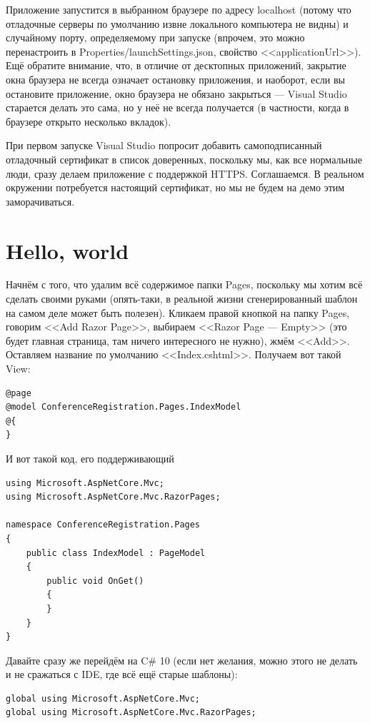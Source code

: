 \documentclass[a5paper]{article}
\begin{document}
Приложение запустится в выбранном браузере по адресу localhost (потому что отладочные серверы по умолчанию извне локального компьютера не видны) и случайному порту, определяемому при запуске (впрочем, это можно перенастроить в Properties/launchSettings.json, свойство <<applicationUrl>>). Ещё обратите внимание, что, в отличие от десктопных приложений, закрытие окна браузера не всегда означает остановку приложения, и наоборот, если вы остановите приложение, окно браузера не обязано закрыться --- Visual Studio старается делать это сама, но у неё не всегда получается (в частности, когда в браузере открыто несколько вкладок).

При первом запуске Visual Studio попросит добавить самоподписанный отладочный сертификат в список доверенных, поскольку мы, как все нормальные люди, сразу делаем приложение с поддержкой HTTPS. Соглашаемся. В реальном окружении потребуется настоящий сертификат, но мы не будем на демо этим заморачиваться.

\section{Hello, world}

Начнём с того, что удалим всё содержимое папки Pages, поскольку мы хотим всё сделать своими руками (опять-таки, в реальной жизни сгенерированный шаблон на самом деле может быть полезен). Кликаем правой кнопкой на папку Pages, говорим <<Add Razor Page>>, выбираем <<Razor Page --- Empty>> (это будет главная страница, там ничего интересного не нужно), жмём <<Add>>. Оставляем название по умолчанию <<Index.cshtml>>. Получаем вот такой View:

\begin{verbatim}
@page
@model ConferenceRegistration.Pages.IndexModel
@{
}
\end{verbatim}

И вот такой код, его поддерживающий

\begin{verbatim}
using Microsoft.AspNetCore.Mvc;
using Microsoft.AspNetCore.Mvc.RazorPages;

namespace ConferenceRegistration.Pages
{
    public class IndexModel : PageModel
    {
        public void OnGet()
        {
        }
    }
}
\end{verbatim}

Давайте сразу же перейдём на C\# 10 (если нет желания, можно этого не делать и не сражаться с IDE, где всё ещё старые шаблоны):

\begin{verbatim}
global using Microsoft.AspNetCore.Mvc;
global using Microsoft.AspNetCore.Mvc.RazorPages;
\end{verbatim}
\end{document}
